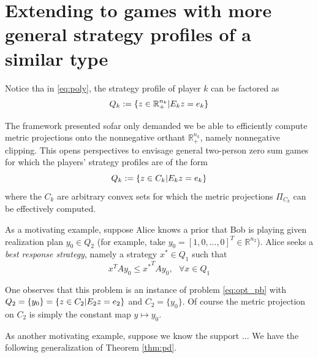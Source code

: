 \documentclass{article} %
\begin{document}
\section{Extending to games with more general strategy profiles of a similar type}
Notice tha in \eqref{eq:poly}, the strategy profile of player $k$ can be factored as
\begin{equation}
  Q_k := \{z \in \mathbb{R}^{n_k}_+| E_kz = e_k\text\}
\end{equation}

The framework presented sofar only demanded we be able to efficiently compute metric projections onto the nonnegative orthant $\mathbb{R}^{n_k}_+$, namely nonnegative clipping. This opens perspectives to envisage general two-person zero sum games for which the players' strategy profiles are of the form
\begin{equation}
  Q_k := \{z \in C_k| E_kz = e_k\text\}
  \label{eq:q_gen}
\end{equation}
where the $C_k$ are arbitrary convex sets for which the metric projections $\Pi_{C_k}$ can be effectively computed.

As a motivating example, suppose Alice knows a prior that Bob is playing given realization plan $y_0 \in Q_2$ (for example, take $y_0 = [1, 0, ..., 0]^T \in \mathbb{R}^{n_2}$). Alice seeks a \textit{best response strategy}, namely a strategy $x^* \in Q_1$ such that
\begin{equation}
  x^TAy_0 \le {x^*}^TAy_0,\text{ } \forall x \in Q_1
\end{equation}

One observes that this problem is an instance of problem \eqref{eq:opt_pb} with
$Q_2 = \{y_0\} = \{z \in C_2| E_2z = e_2\text\}$ and $C_2 = \{y_0\}$. Of course the metric projection on $C_2$ is simply the constant map $y \mapsto y_0$.

As another motivating example, suppose we know the support ...
We have the following generalization of Theorem \ref{thm:pd}.
\end{document}
